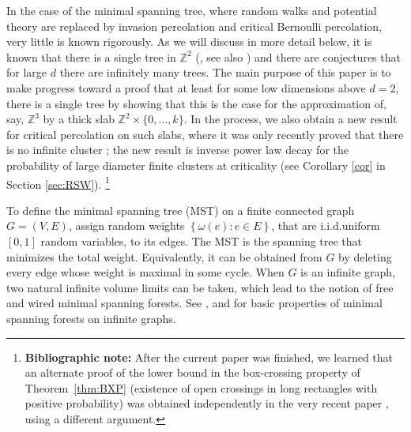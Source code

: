 \documentclass[12pt, twoside,a4paper,reqno]{amsart}
\theoremstyle{plain}
\theoremstyle{remark}
\theoremstyle{definition}
\newcommand{\Z}{\mathbb{Z}}
\newcommand\blfootnote[1]{%
  \begingroup
  \renewcommand\thefootnote{}\footnote{#1}%
  \addtocounter{footnote}{-1}%
  \endgroup
}
\begin{document}
In the case of the minimal spanning tree, where random walks and potential theory
are replaced by invasion percolation and critical Bernoulli percolation,
very little is known rigorously. As we will discuss in more detail below,
it is known that there is a single tree in $\Z^2$ (\cite{CCN}, see also \cite{AM}) and there are conjectures that for large $d$
there are infinitely many trees. The main purpose of this paper is to make progress
toward a proof that at least for some low dimensions above $d=2$, there is a single
tree by showing that this is the case for the approximation of, say, $\Z^3$ by a thick
slab $\Z^2\times \{0,\ldots,k\}$. In the process, we also obtain a new result
for critical percolation on such slabs, where it was only recently proved that
there is no infinite cluster \cite{DST}; the new result is inverse power law
decay for the probability of large diameter finite clusters at criticality (see Corollary \ref{cor} in Section \ref{sec:RSW}).\blfootnote{\textbf{Bibliographic note:} After the current paper was finished, we learned that an alternate proof of the lower bound in the
  box-crossing property of Theorem~\ref{thm:BXP} (existence of open crossings in
  long rectangles with positive probability) was obtained
independently in the very recent paper \cite{sapozhnikov2015crossing}, using a different argument.}

To define the minimal spanning tree (MST) on
a finite connected graph $G=\left( V,E\right) $, assign random weights
$\left\{ \omega \left( e\right) :e\in E\right\} $, that are i.i.d.\@ uniform
$\left[ 0,1\right] $ random variables, to its edges. The MST
is the spanning tree that minimizes the total weight. Equivalently, it can be
obtained from $G$ by deleting every edge whose weight is maximal in some
cycle. When $G$ is an infinite graph, two natural infinite volume limits can be
taken, which lead to the notion of free and wired minimal spanning forests. See
\cite{Alex}, \cite{Hagg} and \cite{LPS} for basic properties of minimal spanning
forests on infinite graphs.
\end{document}
